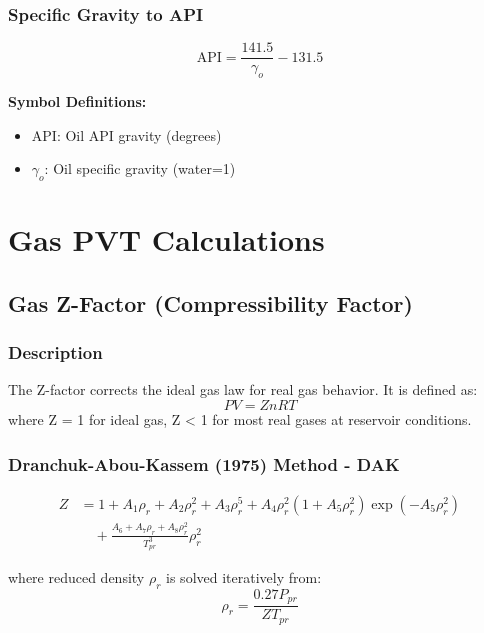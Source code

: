 \documentclass[11pt,a4paper]{article}
\newcommand{\symitem}[2]{\item \textbf{#1}: #2}
\begin{document}
\subsubsection{Specific Gravity to API}

\begin{tcolorbox}[colback=formulabox,colframe=black!75]
\begin{equation}
\text{API} = \frac{141.5}{\gamma_o} - 131.5
\end{equation}
\end{tcolorbox}

\textbf{Symbol Definitions:}
\begin{itemize}[leftmargin=2cm]
\symitem{$\text{API}$}{Oil API gravity (degrees)}
\symitem{$\gamma_o$}{Oil specific gravity (water=1)}
\end{itemize}

\newpage

\section{Gas PVT Calculations}

\subsection{Gas Z-Factor (Compressibility Factor)}

\subsubsection{Description}
The Z-factor corrects the ideal gas law for real gas behavior. It is defined as:
\begin{equation}
PV = ZnRT
\end{equation}
where Z = 1 for ideal gas, Z < 1 for most real gases at reservoir conditions.

\subsubsection{Dranchuk-Abou-Kassem (1975) Method - DAK}

\begin{tcolorbox}[colback=formulabox,colframe=black!75]
\begin{align}
Z &= 1 + A_1 \rho_r + A_2 \rho_r^2 + A_3 \rho_r^5 + A_4 \rho_r^2 (1 + A_5 \rho_r^2) \exp(-A_5 \rho_r^2) \\
&\quad + \frac{A_6 + A_7 \rho_r + A_8 \rho_r^2}{T_{pr}^3} \rho_r^2
\end{align}

where reduced density $\rho_r$ is solved iteratively from:
\begin{equation}
\rho_r = \frac{0.27 P_{pr}}{Z T_{pr}}
\end{equation}
\end{tcolorbox}
\end{document}
